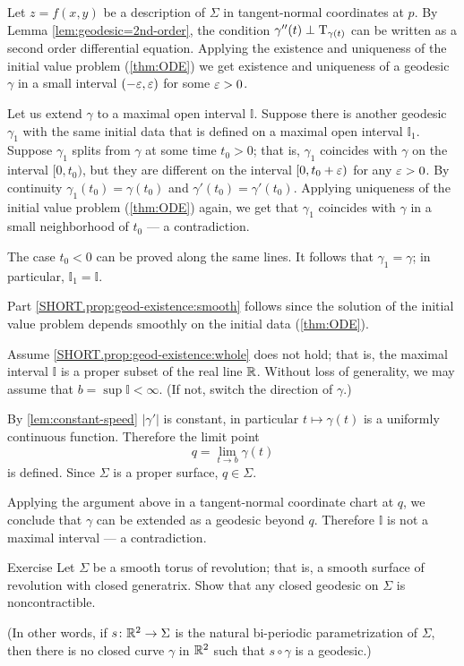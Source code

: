 Let $z=f(x,y)$ be a description of $\Sigma$ in tangent-normal coordinates at $p$.
By Lemma \ref{lem:geodesic=2nd-order}, the condition $\gamma''(t)\perp\mathrm{T}_{\gamma(t)}$ can be written as a second order differential equation.
Applying the existence and uniqueness of the initial value problem (\ref{thm:ODE}) we get existence and uniqueness of a geodesic $\gamma$  in a small interval $(-\varepsilon,\varepsilon)$ for some $\varepsilon>0$.

Let us extend $\gamma$ to a maximal open interval $\mathbb{I}$.
Suppose there is another geodesic $\gamma_1$ with the same initial data that is defined on a maximal open interval $\mathbb{I}_1$.
Suppose $\gamma_1$ splits from $\gamma$ at some time $t_0>0$;
that is, $\gamma_1$ coincides with $\gamma$ on the interval $[0,t_0)$, but they are different on the interval $[0,t_0+\varepsilon)$ for any $\varepsilon>0$.
By continuity $\gamma_1(t_0)=\gamma(t_0)$ and $\gamma'(t_0)=\gamma'(t_0)$.
Applying uniqueness of the initial value problem (\ref{thm:ODE}) again, we get that $\gamma_1$ coincides with $\gamma$ in a small neighborhood of $t_0$ --- a contradiction.

The case $t_0<0$ can be proved along the same lines.
It follows that $\gamma_1=\gamma$;
in particular, $\mathbb{I}_1=\mathbb{I}$.

Part \ref{SHORT.prop:geod-existence:smooth} follows since the solution of the initial value problem depends smoothly on the initial data (\ref{thm:ODE}).

Assume \ref{SHORT.prop:geod-existence:whole} does not hold;
that is, the maximal interval $\mathbb{I}$ is a proper subset of the real line $\mathbb{R}$.
Without loss of generality, we may assume that $b=\sup\mathbb{I}<\infty$.
(If not, switch the direction of $\gamma$.)

By \ref{lem:constant-speed} $|\gamma'|$ is constant, in particular $t\mapsto \gamma(t)$ is a uniformly continuous function.
Therefore  the limit point
\[q=\lim_{t\to b}\gamma(t)\] 
is defined.
Since $\Sigma$ is a proper surface, $q\in \Sigma$. 

Applying the argument above in a tangent-normal coordinate chart at $q$, we conclude that $\gamma$ can be extended as a geodesic beyond $q$.
Therefore $\mathbb{I}$ is not a maximal interval --- a contradiction.
\qeds

\begin{thm}{Exercise}\label{ex:round-torus}
Let $\Sigma$ be a smooth torus of revolution; that is,
a smooth surface of revolution with closed generatrix.
Show that any closed geodesic on $\Sigma$ is noncontractible.

(In other words, if $s\colon\mathbb{R}^2\to \Sigma$ is the natural bi-periodic parametrization of $\Sigma$, then
there is no closed curve $\gamma$ in $\mathbb{R}^2$ such that $s\circ\gamma$ is a geodesic.)
\end{thm}


